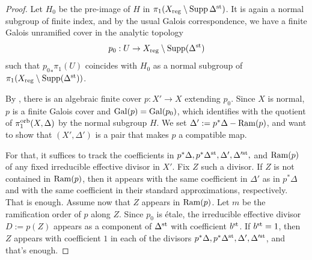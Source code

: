 \documentclass{amsart}
\theoremstyle{definition}
\theoremstyle{remark}
\numberwithin{equation}{section}
\begin{document}
\begin{proof}
    Let $H_0$ be the pre-image of $H$ in $\pi_1(X_{\rm reg}\setminus {\rm Supp}\,\Delta^{\rm st})$. It is again a normal subgroup of finite index, and by the usual Galois correspondence, we have a finite Galois unramified cover in the analytic topology 
    $$p_0:U\to X_{\rm reg}\setminus {\rm Supp}(\Delta^{\rm st})$$ 
    such that ${p_0}_*\pi_1(U)$ coincides with $H_0$ as a normal subgroup of $\pi_1(X_{\rm reg}\setminus {\rm Supp}(\Delta^{\rm st}))$. 
    
    By \cite[Theorems 3.4 and 3.5]{DG94}, there is an algebraic finite cover $p:X'\to X$ extending $p_0$. Since $X$ is normal, $p$ is a finite Galois cover and ${\rm Gal}(p)={\rm Gal}(p_0)$, which identifies with the quotient of $\pi_1^{\rm orb}(X,\Delta)$ by the normal subgroup $H$. 
    We set $\Delta':=p^*\Delta-{\rm Ram}(p)$, and want to show that $(X',\Delta')$ is a pair that makes $p$ a compatible map. 

    For that, it suffices to track the coefficients in $p^*\Delta,p^*\Delta^{\rm st},\Delta',\Delta'^{\rm st},$ and ${\rm Ram}(p)$ of any fixed irreducible effective divisor in $X'$. Fix $Z$ such a divisor.
    If $Z$ is not contained in ${\rm Ram}(p)$, then it appears with the same coefficient in $\Delta'$ as in $p^*\Delta$ and with the same coefficient in their standard approximations, respectively. That is enough.
    Assume now that $Z$ appears in ${\rm Ram}(p)$. Let $m$ be the ramification order of $p$ along $Z.$ Since $p_0$ is \'etale, the irreducible effective divisor $D:=p(Z)$ appears as a component of $\Delta^{\rm st}$ with coefficient $b^{\rm st}$. If $b^{\rm st} = 1$, then $Z$ appears with coefficient $1$ in each of the divisors $p^*\Delta,p^*\Delta^{\rm st},\Delta',\Delta'^{\rm st}$, and that's enough.


\end{proof}
\end{document}
